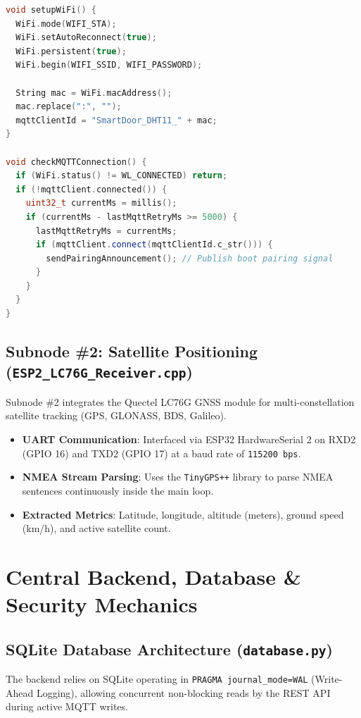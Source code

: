 \documentclass[11pt,a4paper]{article}
\begin{document}
\begin{lstlisting}[language=C++, caption={Non-blocking Wi-Fi auto-reconnect and hardware MAC ID generation in ESP32 firmware.}]
void setupWiFi() {
  WiFi.mode(WIFI_STA);
  WiFi.setAutoReconnect(true);
  WiFi.persistent(true);
  WiFi.begin(WIFI_SSID, WIFI_PASSWORD);
  
  String mac = WiFi.macAddress();
  mac.replace(":", "");
  mqttClientId = "SmartDoor_DHT11_" + mac;
}

void checkMQTTConnection() {
  if (WiFi.status() != WL_CONNECTED) return;
  if (!mqttClient.connected()) {
    uint32_t currentMs = millis();
    if (currentMs - lastMqttRetryMs >= 5000) {
      lastMqttRetryMs = currentMs;
      if (mqttClient.connect(mqttClientId.c_str())) {
        sendPairingAnnouncement(); // Publish boot pairing signal
      }
    }
  }
}
\end{lstlisting}

\subsection{Subnode \#2: Satellite Positioning (\texttt{ESP2\_LC76G\_Receiver.cpp})}
Subnode \#2 integrates the Quectel LC76G GNSS module for multi-constellation satellite tracking (GPS, GLONASS, BDS, Galileo).
\begin{itemize}
    \item \textbf{UART Communication}: Interfaced via ESP32 HardwareSerial 2 on RXD2 (GPIO 16) and TXD2 (GPIO 17) at a baud rate of \texttt{115200 bps}.
    \item \textbf{NMEA Stream Parsing}: Uses the \texttt{TinyGPS++} library to parse NMEA sentences continuously inside the main loop.
    \item \textbf{Extracted Metrics}: Latitude, longitude, altitude (meters), ground speed (km/h), and active satellite count.
\end{itemize}

\vspace{1em}

\section{Central Backend, Database \& Security Mechanics}

\subsection{SQLite Database Architecture (\texttt{database.py})}
The backend relies on SQLite operating in \texttt{PRAGMA journal\_mode=WAL} (Write-Ahead Logging), allowing concurrent non-blocking reads by the REST API during active MQTT writes.
\end{document}
